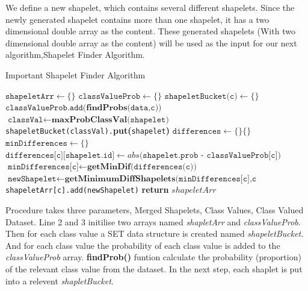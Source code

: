 \documentclass[letterpaper, 10 pt, conference]{IEEEtran}  %
\begin{document}
We define a new shapelet, which contains several different shapelets. Since the newly generated shapelet contains more than one shapelet, it has a two dimensional double array as the content. These generated shapelets (With two dimensional double array as the content) will be used as the input for our next algorithm,Shapelet Finder Algorithm.  


\begin{algorithm}[H]
  \caption{Important Shapelet Finder Algorithm}\label{shapeletFInder}
  \begin{algorithmic}[1]
     \State $\texttt{shapeletArr} \gets \{\}$
     \State $\texttt{classValueProb} \gets \{\}$
     \State $\texttt{shapeletBucket(c)} \gets \{\}$
     \State $\texttt{classValueProb.add(}  \textbf{findProbs(}\texttt{data,c))}$
     \EndFor
     \State $\texttt{classVal} \gets \textbf{maxProbClassVal(} \texttt{shapelet} \textbf{)}$
     \State \texttt{shapeletBucket(classVal).}\textbf{put(}\texttt{shapelet}\textbf{)}
     \EndFor
     \State $\texttt{differences} \gets \{\} \{\}$
     \State $\texttt{minDifferences} \gets \{\}$
     	\State $\texttt{differences[c][shapelet.id]} \gets \textbf{}{abs(} \texttt{shapelet.prob - classValueProb[c])}$
     \EndFor
     \State $\texttt{minDifferences[c]} \gets \textbf{getMinDif(}\texttt{differences(c))}$
     $\texttt{newShapelet} \gets \textbf{getMinimumDiffShapelets(}
     \texttt{minDifferences[c],c}\textbf{}$
     \State \texttt{shapeletArr[c].add(newShapelet)}
     \EndFor
      \State \textbf{return} $shapeletArr$
    \EndProcedure
  \end{algorithmic}
\end{algorithm}

Procedure takes three parameters, Merged Shapelets, Class Values, Class Valued Dataset. Line 2 and 3 initilise two arrays named \textit{shapletArr}  and \textit{classValueProb}. Then for each class value a SET data structure is created named \textit{shapeletBucket}. And for each class value the probability of each class value is added to the \textit{classValueProb} array. \textbf{findProb()} funtion calculate the probability (proportion) of the relevant class value from the dataset. In the next step, each shaplet is put into a relevent \textit{shapletBucket}.
\end{document}
